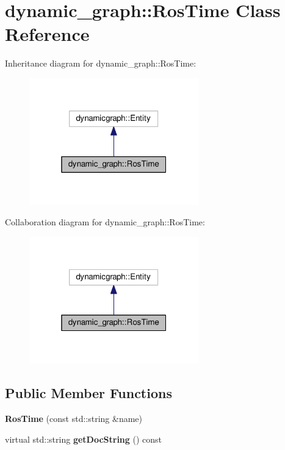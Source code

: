 \hypertarget{classdynamic__graph_1_1RosTime}{}\section{dynamic\+\_\+graph\+:\+:Ros\+Time Class Reference}
\label{classdynamic__graph_1_1RosTime}


Inheritance diagram for dynamic\+\_\+graph\+:\+:Ros\+Time\+:\nopagebreak
\begin{figure}[H]
\begin{center}
\leavevmode
\includegraphics[width=208pt]{classdynamic__graph_1_1RosTime__inherit__graph}
\end{center}
\end{figure}


Collaboration diagram for dynamic\+\_\+graph\+:\+:Ros\+Time\+:\nopagebreak
\begin{figure}[H]
\begin{center}
\leavevmode
\includegraphics[width=208pt]{classdynamic__graph_1_1RosTime__coll__graph}
\end{center}
\end{figure}
\subsection*{Public Member Functions}
\begin{DoxyCompactItemize}
\item 
{\bfseries Ros\+Time} (const std\+::string \&name)\hypertarget{classdynamic__graph_1_1RosTime_aa909f2b766b54a543a59ae8642db3bc0}{}\label{classdynamic__graph_1_1RosTime_aa909f2b766b54a543a59ae8642db3bc0}

\item 
virtual std\+::string {\bfseries get\+Doc\+String} () const \hypertarget{classdynamic__graph_1_1RosTime_ad82554947f14f37bc07ccdfde068a3e6}{}\label{classdynamic__graph_1_1RosTime_ad82554947f14f37bc07ccdfde068a3e6}

\end{DoxyCompactItemize}
